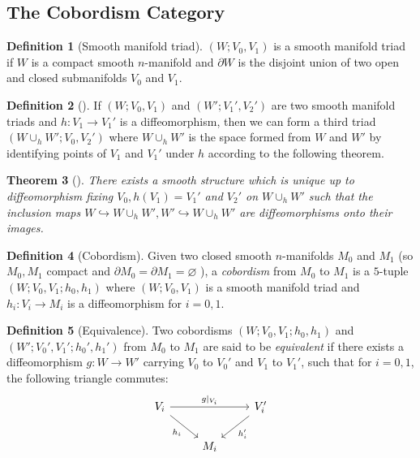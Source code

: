 \documentclass[reqno]{amsart}
\newtheorem{theorem}{Theorem}[section]
\theoremstyle{definition}
\newtheorem{definition}[theorem]{Definition}
\theoremstyle{remark}
\begin{document}
    \subsection{The Cobordism Category}

    \begin{definition}[Smooth manifold triad]
        $\left( W; V_0,V_1 \right) $ is a smooth
        manifold triad if $W$ is a compact
        smooth $n$-manifold and $\partial W$ is the disjoint
        union of two open and closed submanifolds
        $V_0$ and $V_1$.
    \end{definition}

    \begin{definition}[]
        If $\left( W; V_0,V_1 \right) $ and
        $\left( W'; V_1', V_2' \right) $ are two
        smooth manifold triads and
        $h \colon V_1 \to V_1'$ is a diffeomorphism,
        then we can form a third triad
        $\left( W \cup_h W'; V_0, V_2' \right) $ where
        $W \cup_h W'$ is the space formed from
        $W$ and $W'$ by identifying points of
        $V_1$ and $V_1'$ under $h$ according to the
        following theorem.
    \end{definition}

    \begin{theorem}[]\label{sm-structure-cobordism-composition}
        There exists a smooth structure which is unique
        up to diffeomorphism fixing $V_0, h(V_1) = V_1'$ and
        $V_2'$ on
        $W \cup_h W'$  such that
        the inclusion maps
        $W \hookrightarrow W \cup_h W',
        W' \hookrightarrow W\cup_h W'$ are diffeomorphisms
        onto their images.
    \end{theorem}

    \begin{definition}[Cobordism]
        Given two closed smooth $n$-manifolds
        $M_0$ and $M_1$ (so $M_0,M_1$ compact and
        $\partial M_0 = \partial M_1 = \varnothing$ ),
        a \textit{cobordism} from
        $M_0$ to $M_1$ is a $5$-tuple
        $\left( W; V_0, V_1; h_0 , h_1 \right) $ where
        $\left( W; V_0, V_1 \right) $ is a smooth
        manifold triad and 
        $h_i \colon V_i \to M_i$ is a diffeomorphism for
        $i = 0,1$.
    \end{definition}


    \begin{definition}[Equivalence]
        Two cobordisms
        $\left( W;V_0,V_1;h_0,h_1 \right) $ and
        $\left( W';V_0',V_1';h_0',h_1' \right) $ from
        $M_0$ to $M_1$ are said to be \textit{equivalent} if
        there exists a diffeomorphism
        $g \colon W \to W'$ carrying $V_0$ to $V_0'$ 
        and $V_1$ to $V_1'$, such that for
        $i = 0,1$, the following triangle commutes:
        \begin{equation*}
        \begin{tikzcd}
            V_i \ar[rr, "g|_{V_i}"]\ar[dr, "h_i"']
            && V_i' \ar[dl, "h_i'"]\\
                                    & M_i &
        \end{tikzcd}
        \end{equation*}
    \end{definition}
\end{document}
